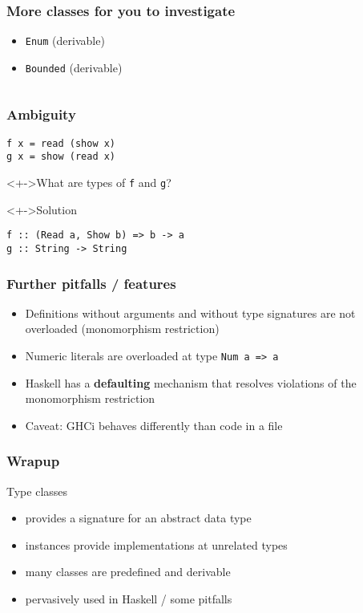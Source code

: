 \documentclass{beamer}
\begin{document}
\begin{frame}[fragile]
  \frametitle{More classes for you to investigate}
  \begin{itemize}
  \item \texttt{Enum} (derivable)
  \item \texttt{Bounded} (derivable)
  \end{itemize}
\begin{verbatim}
\end{verbatim}
\end{frame}
\begin{frame}[fragile]
  \frametitle{Ambiguity}
\begin{verbatim}
f x = read (show x)
g x = show (read x)
\end{verbatim}
\begin{block}<+->{What are types of \texttt{f} and \texttt{g}?}
\end{block}
\begin{block}<+->{Solution}
\begin{verbatim}
f :: (Read a, Show b) => b -> a
g :: String -> String
\end{verbatim}
\end{block}
\end{frame}
\begin{frame}[fragile]
  \frametitle{Further pitfalls / features}
  \begin{itemize}
  \item Definitions without arguments and without type signatures are not overloaded (monomorphism restriction)
  \item Numeric literals are overloaded at type \texttt{Num a => a}
  \item Haskell has a \textbf{defaulting} mechanism that resolves violations of the monomorphism restriction 
  \item Caveat: GHCi behaves differently than code in a file
  \end{itemize}
\end{frame}
\begin{frame}
  \frametitle{Wrapup}
  \begin{alertblock}{Type classes}
  \begin{itemize}
  \item provides a signature for an abstract data type
  \item instances provide implementations at unrelated types
  \item many classes are predefined and derivable
  \item pervasively used in Haskell / some pitfalls
  \end{itemize}
  \end{alertblock}
\end{frame}

\end{document}
